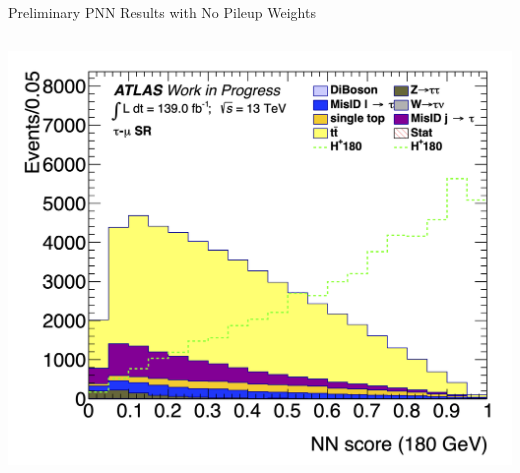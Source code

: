 \documentclass[aspectratio=169,xcolor=table]{beamer}
\begin{document}
\begin{frame}{Preliminary PNN Results with No Pileup Weights}
\begin{columns}
        \includegraphics[height=.24\textheight,keepaspectratio=true]{Scores/taulep/myOutDirClfEval_1p_noUpsilon_test_full/clf_score_GB200_mass_180to180_SR_TAUMU.png}


\end{columns}
\end{frame}
\end{document}
